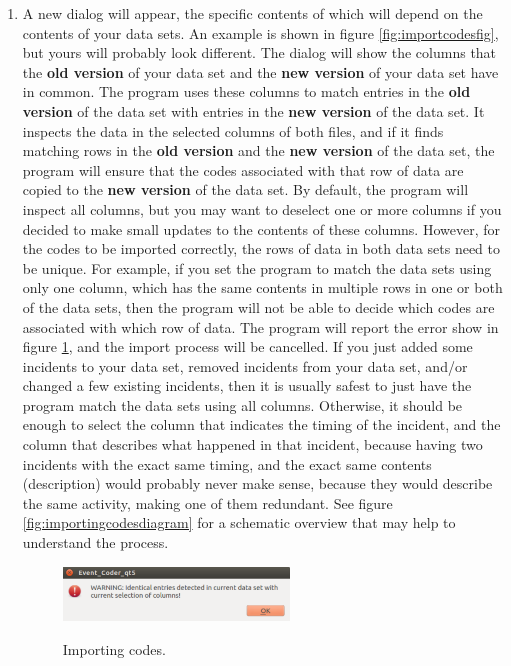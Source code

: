 \documentclass{memoir}
\begin{document}
\begin{enumerate}
\item{A new dialog will appear, the specific contents of which will depend on the contents of your data sets. An example is shown in figure \ref{fig:importcodesfig}, but yours will probably look different. The dialog will show the columns that the \textbf{old version} of your data set and the \textbf{new version} of your data set have in common. The program uses these columns to match entries in the \textbf{old version} of the data set with entries in the \textbf{new version} of the data set. It inspects the data in the selected columns of both files, and if it finds matching rows in the \textbf{old version} and the \textbf{new version} of the data set, the program will ensure that the codes associated with that row of data are copied to the \textbf{new version} of the data set. By default, the program will inspect all columns, but you may want to deselect one or more columns if you decided to make small updates to the contents of these columns. However, for the codes to be imported correctly, the rows of data in both data sets need to be unique. For example, if you set the program to match the data sets using only one column, which has the same contents in multiple rows in one or both of the data sets, then the program will not be able to decide which codes are associated with which row of data. The program will report the error show in figure \ref{fig:importingcodeserror}, and the import process will be cancelled. If you just added some incidents to your data set, removed incidents from your data set, and/or changed a few existing incidents, then it is usually safest to just have the program match the data sets using all columns. Otherwise, it should be enough to select the column that indicates the timing of the incident, and the column that describes what happened in that incident, because having two incidents with the exact same timing, and the exact same contents (description) would probably never make sense, because they would describe the same activity, making one of them redundant. See figure \ref{fig:importingcodesdiagram} for a schematic overview that may help to understand the process.}
  \begin{figure}[h!]
  \centering
  \caption{Importing codes.}
  \includegraphics[width=60mm]{Screenshot_26.pdf}
  \label{fig:importingcodeserror}
\end{figure}


\end{enumerate}
\end{document}
